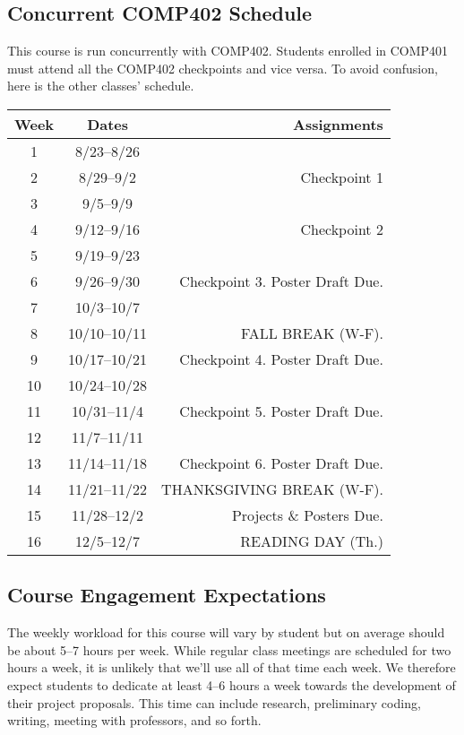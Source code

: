 \documentclass[10pt]{article}
\begin{document}
\subsection{Concurrent COMP402 Schedule}

This course is run concurrently with COMP402. Students enrolled in COMP401 must attend all the COMP402 checkpoints and vice versa. To avoid confusion, here is the other classes' schedule.

\begin{center}
\begin{tabular}{ccr}
\toprule
Week & Dates & Assignments \\
\toprule
1 & 8/23--8/26 &  \\
2 & 8/29--9/2 &   Checkpoint 1 \\
3 & 9/5--9/9 &    \\
4 & 9/12--9/16 & Checkpoint 2  \\
5 & 9/19--9/23 &   \\
6 & 9/26--9/30  &  Checkpoint 3. Poster Draft Due. \\
7 & 10/3--10/7 &  \\
8 & 10/10--10/11 & FALL BREAK (W-F). \\
9 & 10/17--10/21 & Checkpoint 4. Poster Draft Due. \\
10 & 10/24--10/28 &  \\
11 & 10/31--11/4 & Checkpoint 5. Poster Draft Due. \\
12 & 11/7--11/11 &  \\
13 & 11/14--11/18 & Checkpoint 6. Poster Draft Due. \\
14 & 11/21--11/22 &  THANKSGIVING BREAK (W-F).  \\
15 & 11/28--12/2 &  Projects \& Posters Due. \\
16 & 12/5--12/7 &  READING DAY (Th.) \\
\bottomrule
\end{tabular}
\end{center}

\subsection{Course Engagement Expectations}

The weekly workload for this course will vary by student but on average should be about 5--7 hours per week.  While regular class meetings are scheduled for two hours a week, it is unlikely that we'll use all of that time each week.  We therefore expect students to dedicate at least 4--6 hours a week towards the development of their project proposals.  This time can include research, preliminary coding, writing, meeting with professors, and so forth.
\end{document}
